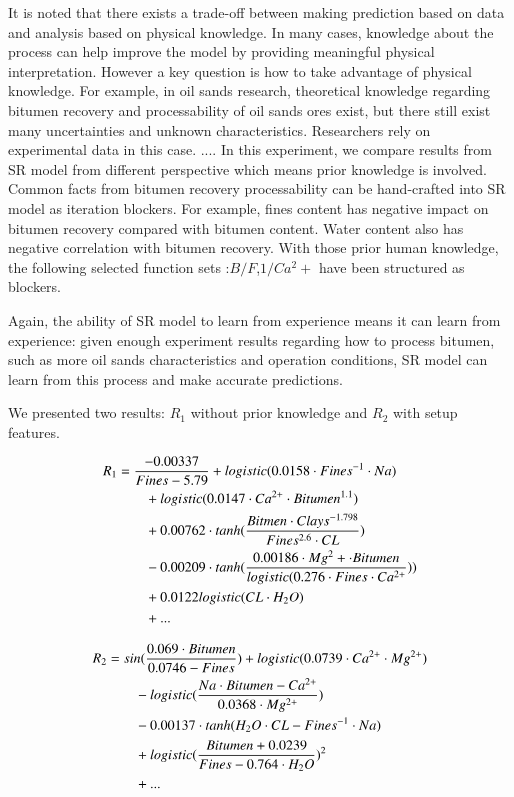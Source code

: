\documentclass[final,5p,times,twocolumn]{elsarticle}
\begin{document}
It is noted that there exists a trade-off between making prediction based on data and analysis based on physical knowledge. In many cases, knowledge about the process can help improve the model by providing meaningful physical interpretation. However a key question is how to take advantage of physical knowledge. For example, in oil sands research, theoretical knowledge regarding bitumen recovery and processability of oil sands ores exist, but there still exist many uncertainties and unknown characteristics. Researchers rely on experimental data in this case.
....
In this experiment, we compare results from SR model from different perspective which means prior knowledge is involved. Common facts from bitumen recovery processability can be hand-crafted into SR model as iteration blockers.
For example, fines content has negative impact on bitumen recovery compared with bitumen content. Water content also has negative correlation with bitumen recovery. With those prior human knowledge, the following selected function sets :${B/F}$,${1/Ca^2+}$ have been structured as blockers.

Again, the ability of SR model to learn from experience means it can learn from experience: given enough experiment results regarding how to process bitumen, such as more oil sands characteristics and operation conditions, SR model can learn from this process and make accurate predictions.

We presented two results: $R_1$ without prior knowledge and $R_2$ with setup features.

\begin{align*} 
    \notag R_1 &= \frac{-0.00337}{Fines-5.79}  + logistic(0.0158 \cdot Fines^{-1} \cdot Na)\\\notag
    &\qquad + logistic(0.0147 \cdot Ca^{2+} \cdot Bitumen^{1.1})\\\notag
    &\qquad + 0.00762 \cdot tanh(\frac{Bitmen \cdot Clays^{-1.798}}{Fines^{2.6} \cdot CL}) \\\notag
    &\qquad - 0.00209 \cdot tanh(\frac{0.00186 \cdot Mg^2+ \cdot Bitumen}{logistic( 0.276 \cdot Fines \cdot Ca^{2+} }))\\\notag 
    &\qquad + 0.0122 logistic ( CL \cdot H_2O)\\\notag 
    &\qquad + ...\\
\end{align*}



\begin{align} 
    \notag R_2 &= sin (\frac{0.069 \cdot Bitumen}{0.0746 - Fines})  + logistic(0.0739 \cdot Ca^{2+} \cdot Mg^{2+} )\\\notag
    &\qquad - logistic(\frac{Na  \cdot Bitumen - Ca^{2+} }{0.0368 \cdot Mg^{2+}})\\\notag
    &\qquad - 0.00137 \cdot tanh(H_2O \cdot CL - Fines^{-1} \cdot Na) \\\notag
    &\qquad + logistic(\frac{Bitumen + 0.0239}{ Fines - 0.764 \cdot H_2O} )^2\\\notag 
    &\qquad + ...\\
\end{align}
\end{document}
